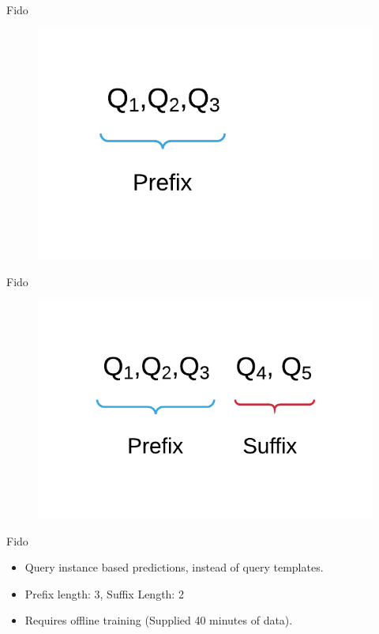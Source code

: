 \documentclass[12pt]{beamer}
\begin{document}
\begin{frame}[fragile]{Fido}
    \begin{figure}
        \center
        \includegraphics[scale=0.3]{apollo_fido_pred}
    \end{figure}
\end{frame}

\begin{frame}[fragile]{Fido}
    \begin{figure}
        \center
        \includegraphics[scale=0.3]{apollo_fido_pred_2}
    \end{figure}
\end{frame}

\begin{frame}[fragile]{Fido}
    \begin{itemize}
        \item{\alert{Query instance} based predictions, instead of query templates.}
        \item{Prefix length: 3, Suffix Length: 2}
        \item{Requires offline training (Supplied 40 minutes of data).}
    \end{itemize}
\end{frame}
\end{document}

